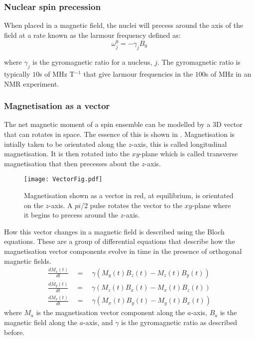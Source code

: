 \subsubsection{Nuclear spin precession}

When placed in a magnetic field, the nuclei will precess around the axis of the field at a rate known as the larmour frequency defined as:
\begin{equation}\label{eqn:larmour}
  \omega_j^0 = -\gamma_jB_0
\end{equation}

where $\gamma_j$ is the gyromagnetic ratio for a nucleus, $j$. The gyromagnetic ratio is
typically $10$s of MHz T$^{-1}$ that give larmour frequencies in the $100$s of MHz in an NMR
experiment.

\subsubsection{Magnetisation as a vector}

The net magnetic moment of a spin ensemble can be modelled by a 3D vector that can rotates in space. The essence of this is shown in . Magnetisation is intially taken to be orientated along the $z$-axis, this is called longitudinal magnetisation. It is then rotated into the $xy$-plane which is called transverse
magnetisation that then precesses about the $z$-axis.

\begin{figure}
  \begin{center}
  \texttt{[image: VectorFig.pdf]}
  \end{center}
  \caption{Magnetisation shown as a vector in red, at equilibrium, is orientated on the $z$-axis. A $pi$/2
  pulse rotates the vector to the $xy$-plane where it begins to precess around the $z$-axis.}
  \label{fig:VectorFig}
\end{figure}

How this vector changes in a magnetic field is described using the Bloch equations\citep{Bloch:1946hk}. These are a group of differential equations that
describe how the magnetisation vector components evolve in time in the
presence of orthogonal magnetic fields.
\begin{align}\label{eqn:Bloch}
  \frac{dM_x(t)}{dt}\quad=\quad\gamma(M_y(t)B_z(t)-M_z(t)B_y(t))\\
  \frac{dM_y(t)}{dt}\quad=\quad\gamma(M_z(t)B_x(t)-M_x(t)B_z(t))\\
  \frac{dM_x(t)}{dt}\quad=\quad\gamma(M_x(t)B_y(t)-M_y(t)B_x(t))
\end{align}
where $M_a$ is the magnetisation vector component along the $a$-axis, $B_a$ is the
magnetic field along the $a$-axis, and $\gamma$ is the gyromagnetic ratio as described before.

